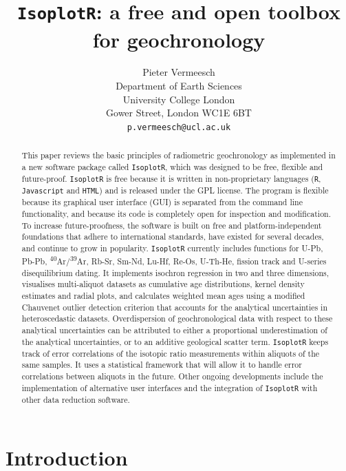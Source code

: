 \documentclass{article}
\title{\texttt{IsoplotR}: a free and open toolbox for geochronology}
\author{Pieter Vermeesch\\Department of Earth Sciences\\
  University College London\\
  Gower Street, London WC1E 6BT\\
  \texttt{p.vermeesch@ucl.ac.uk}
}
\begin{document}
\maketitle

\begin{abstract}
  This paper reviews the basic principles of radiometric geochronology
  as implemented in a new software package called \texttt{IsoplotR},
  which was designed to be free, flexible and future-proof.
  \texttt{IsoplotR} is free because it is written in non-proprietary
  languages (\texttt{R}, \texttt{Javascript} and \texttt{HTML}) and is
  released under the GPL license. The program is flexible because its
  graphical user interface (GUI) is separated from the command line
  functionality, and because its code is completely open for
  inspection and modification. To increase future-proofness, the
  software is built on free and platform-independent foundations that
  adhere to international standards, have existed for several decades,
  and continue to grow in popularity. \texttt{IsoplotR} currently
  includes functions for U-Pb, Pb-Pb,
  \textsuperscript{40}Ar/\textsuperscript{39}Ar, Rb-Sr, Sm-Nd, Lu-Hf,
  Re-Os, U-Th-He, fission track and U-series disequilibrium dating. It
  implements isochron regression in two and three dimensions,
  visualises multi-aliquot datasets as cumulative age distributions,
  kernel density estimates and radial plots, and calculates weighted
  mean ages using a modified Chauvenet outlier detection criterion
  that accounts for the analytical uncertainties in heteroscedastic
  datasets. Overdispersion of geochronological data with respect to
  these analytical uncertainties can be attributed to either a
  proportional underestimation of the analytical uncertainties, or to
  an additive geological scatter term. \texttt{IsoplotR} keeps track
  of error correlations of the isotopic ratio measurements within
  aliquots of the same samples. It uses a statistical framework that
  will allow it to handle error correlations between aliquots in the
  future. Other ongoing developments include the implementation of
  alternative user interfaces and the integration of \texttt{IsoplotR}
  with other data reduction software.
\end{abstract}

\section{Introduction}
\end{document}

